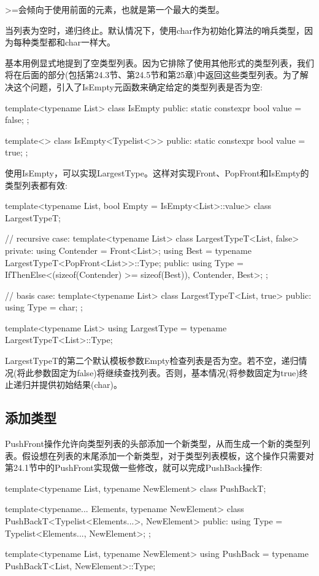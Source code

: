 >=会倾向于使用前面的元素，也就是第一个最大的类型。

当列表为空时，递归终止。默认情况下，使用char作为初始化算法的哨兵类型，因为每种类型都和char一样大。

基本用例显式地提到了空类型列表。因为它排除了使用其他形式的类型列表，我们将在后面的部分(包括第24.3节、第24.5节和第25章)中返回这些类型列表。为了解决这个问题，引入了IsEmpty元函数来确定给定的类型列表是否为空:

\begin{cpp}
template<typename List>
class IsEmpty
{
	public:
	static constexpr bool value = false;
};

template<>
class IsEmpty<Typelist<>> {
	public:
	static constexpr bool value = true;
};
\end{cpp}

使用IsEmpty，可以实现LargestType。这样对实现Front、PopFront和IsEmpty的类型列表都有效:

\begin{cpp}
template<typename List, bool Empty = IsEmpty<List>::value>
class LargestTypeT;

// recursive case:
template<typename List>
class LargestTypeT<List, false>
{
	private:
	using Contender = Front<List>;
	using Best = typename LargestTypeT<PopFront<List>>::Type;
	public:
	using Type = IfThenElse<(sizeof(Contender) >= sizeof(Best)),
	Contender, Best>;
};

// basis case:
template<typename List>
class LargestTypeT<List, true>
{
	public:
	using Type = char;
};

template<typename List>
using LargestType = typename LargestTypeT<List>::Type;
\end{cpp}

LargestTypeT的第二个默认模板参数Empty检查列表是否为空。若不空，递归情况(将此参数固定为false)将继续查找列表。否则，基本情况(将参数固定为true)终止递归并提供初始结果(char)。

\subsection{添加类型}

PushFront操作允许向类型列表的头部添加一个新类型，从而生成一个新的类型列表。假设想在列表的末尾添加一个新类型，对于类型列表模板，这个操作只需要对第24.1节中的PushFront实现做一些修改，就可以完成PushBack操作:

\begin{cpp}
template<typename List, typename NewElement>
class PushBackT;

template<typename... Elements, typename NewElement>
class PushBackT<Typelist<Elements...>, NewElement>
{
	public:
	using Type = Typelist<Elements..., NewElement>;
};

template<typename List, typename NewElement>
using PushBack = typename PushBackT<List, NewElement>::Type;
\end{cpp}

